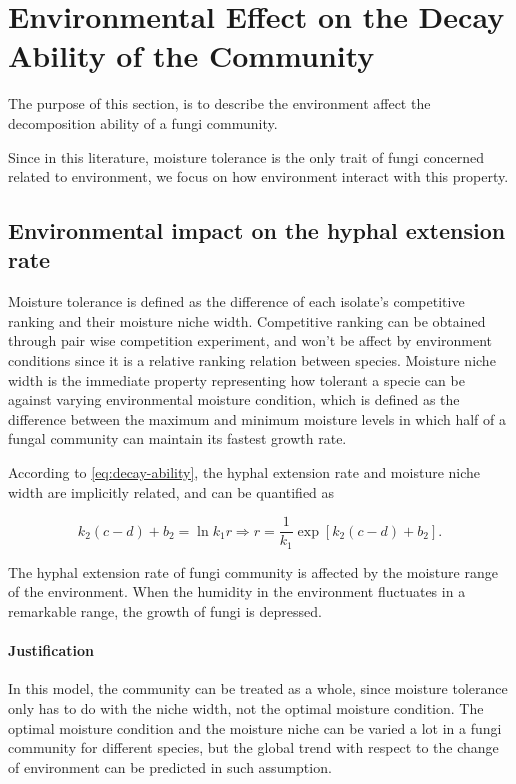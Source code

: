 \section{Environmental Effect on the Decay Ability of the Community}\label{sec:env}

The purpose of this section, is to describe the environment affect the decomposition ability of a fungi community.

Since in this literature, moisture tolerance is the only trait of fungi concerned related to environment, we focus on how environment interact with this property.

\subsection{Environmental impact on the hyphal extension rate}

Moisture tolerance is defined as the difference of each isolate’s competitive ranking and their moisture niche width. Competitive ranking can be obtained through pair wise competition experiment, and won't be affect by environment conditions since it is a relative ranking relation between species. Moisture niche width is the immediate property representing how tolerant a specie can be against varying environmental moisture condition, which is defined as the difference between the maximum and minimum moisture levels in which half of a fungal community can maintain its fastest growth rate.

According to \eqref{eq:decay-ability}, the hyphal extension rate and moisture niche width are implicitly related, and can be quantified as

\begin{equation}
    k_2(c - d) + b_2 = \ln k_1r \Rightarrow
    r = \frac{1}{k_1} \exp[k_2(c -d) +b_2].
\end{equation}

\begin{definition}
    The hyphal extension rate of fungi community is affected by the moisture range of the environment. When the humidity in the environment fluctuates in a remarkable range, the growth of fungi is depressed. 
\end{definition}
\paragraph*{Justification} In this model, the community can be treated as a whole, since moisture tolerance only has to do with the niche width, not the optimal moisture condition. The optimal moisture condition and the moisture niche can be varied a lot in a fungi community for different species, but the global trend with respect to the change of environment can be predicted in such assumption.


